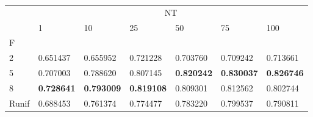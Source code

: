\begin{table}[htbp]
\centering
\label{heart-results}
\begin{tabular}{lllllll}
\toprule
 & \multicolumn{6}{c}{NT} \\
 & 1 & 10 & 25 & 50 & 75 & 100 \\
F &  &  &  &  &  &  \\
\midrule
2 & 0.651437 & 0.655952 & 0.721228 & 0.703760 & 0.709242 & 0.713661 \\
5 & 0.707003 & 0.788620 & 0.807145 & \textbf{0.820242} & \textbf{0.830037} & \textbf{0.826746} \\
8 & \textbf{0.728641} & \textbf{0.793009} & \textbf{0.819108} & 0.809301 & 0.812562 & 0.802744 \\
Runif & 0.688453 & 0.761374 & 0.774477 & 0.783220 & 0.799537 & 0.790811 \\
\bottomrule
\end{tabular}
\end{table}
